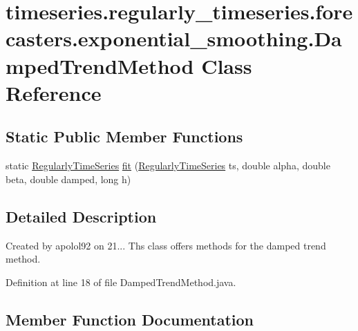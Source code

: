 \hypertarget{classtimeseries_1_1regularly__timeseries_1_1forecasters_1_1exponential__smoothing_1_1_damped_trend_method}{}\section{timeseries.\+regularly\+\_\+timeseries.\+forecasters.\+exponential\+\_\+smoothing.\+Damped\+Trend\+Method Class Reference}
\label{classtimeseries_1_1regularly__timeseries_1_1forecasters_1_1exponential__smoothing_1_1_damped_trend_method}
\subsection*{Static Public Member Functions}
\begin{DoxyCompactItemize}
\item 
static \hyperlink{classtimeseries_1_1_regularly_time_series}{Regularly\+Time\+Series} \hyperlink{classtimeseries_1_1regularly__timeseries_1_1forecasters_1_1exponential__smoothing_1_1_damped_trend_method_a081fa883569b0f59833f5f7e57c48d51}{fit} (\hyperlink{classtimeseries_1_1_regularly_time_series}{Regularly\+Time\+Series} ts, double alpha, double beta, double damped, long h)
\end{DoxyCompactItemize}


\subsection{Detailed Description}
Created by apolol92 on 21... Ths class offers methods for the damped trend method. 

Definition at line 18 of file Damped\+Trend\+Method.\+java.



\subsection{Member Function Documentation}
\hypertarget{classtimeseries_1_1regularly__timeseries_1_1forecasters_1_1exponential__smoothing_1_1_damped_trend_method_a081fa883569b0f59833f5f7e57c48d51}{}
